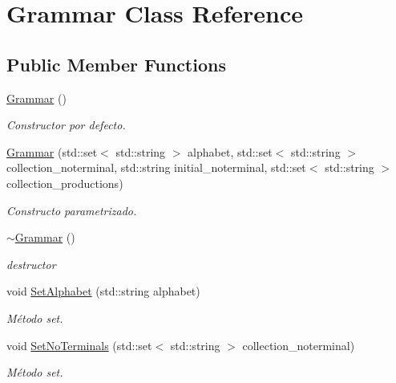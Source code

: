 \hypertarget{classGrammar}{}\section{Grammar Class Reference}
\label{classGrammar}
\subsection*{Public Member Functions}
\begin{DoxyCompactItemize}
\item 
\hyperlink{classGrammar_aa201250a002a7d07d398fee189a74427}{Grammar} ()
\begin{DoxyCompactList}\small\item\em Constructor por defecto. \end{DoxyCompactList}\item 
\hyperlink{classGrammar_abdecbf25f0c6b60706453ab86c3f9643}{Grammar} (std\+::set$<$ std\+::string $>$ alphabet, std\+::set$<$ std\+::string $>$ collection\+\_\+noterminal, std\+::string initial\+\_\+noterminal, std\+::set$<$ std\+::string $>$ collection\+\_\+productions)
\begin{DoxyCompactList}\small\item\em Constructo parametrizado. \end{DoxyCompactList}\item 
\mbox{\label{classGrammar_a60e8bade0190ee9830d9c600e4216b36}} 
\hyperlink{classGrammar_a60e8bade0190ee9830d9c600e4216b36}{$\sim$\+Grammar} ()
\begin{DoxyCompactList}\small\item\em destructor \end{DoxyCompactList}\item 
void \hyperlink{classGrammar_abd0efb1c23b6c09443b996adbb2d82be}{Set\+Alphabet} (std\+::string alphabet)
\begin{DoxyCompactList}\small\item\em Método set. \end{DoxyCompactList}\item 
void \hyperlink{classGrammar_af8f0dda3f50275d6dac186d6579e9d23}{Set\+No\+Terminals} (std\+::set$<$ std\+::string $>$ collection\+\_\+noterminal)
\begin{DoxyCompactList}\small\item\em Método set. \end{DoxyCompactList}\item 
\mbox{\label{classGrammar_ab8e7d6fbdbbb97205f9baabab8f900cc}} 

\end{DoxyCompactItemize}
